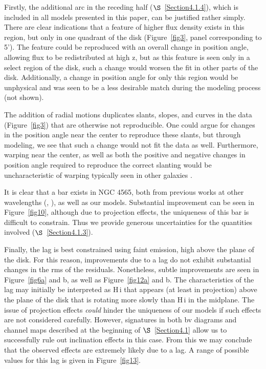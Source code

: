 \documentclass{emulateapj}
\begin{document}
\par 
    Firstly, the additional arc in the receding half ($\S$~\ref{Section4.1.4}), which is included in all models presented in this paper, can be justified rather simply.  There are clear indications that a feature of higher flux density exists in this region, but only in one quadrant of the disk (Figure~\ref{fig3}, panel corresponding to 5').  The feature could be reproduced with an overall change in position angle, allowing flux to be redistributed at high z, but as this feature is seen only in a select region of the disk, such a change would worsen the fit in other parts of the disk.  Additionally, a change in position angle for only this region would be unphysical and was seen to be a less desirable match during the modeling process (not shown).  

\par
    The addition of radial motions duplicates slants, slopes, and curves in the data (Figure~\ref{fig3}) that are otherwise not reproducible.  One could argue for changes in the position angle near the center to reproduce these slants, but through modeling, we see that such a change would not fit the data as well.  Furthermore, warping near the center, as well as both the positive and negative changes in position angle required to reproduce the correct slanting would be uncharacteristic of warping typically seen in other galaxies \citep{1990ApJ...352...15B}.

\par
    It is clear that a bar exists in NGC 4565, both from previous works at other wavelengths (\citealt{2010ApJ...715L.176K}, \citealt{1996A&A...310..725N}), as well as our models.  Substantial improvement can be seen in Figure~\ref{fig10}, although due to projection effects, the uniqueness of this bar is difficult to constrain. Thus we provide generous uncertainties for the quantities involved ($\S$~\ref{Section4.1.3}).

\par
    Finally, the lag is best constrained using faint emission, high above the plane of the disk.  For this reason, improvements due to a lag do not exhibit substantial changes in the rms of the residuals.  Nonetheless, subtle improvements are seen in Figure~\ref{fig6a} and b, as well as Figure~\ref{fig12a} and b.  The characteristics of the lag may initially be interpreted as {\sc H\,i} that appears (at least in projection) above the plane of the disk that is rotating more slowly than {\sc H\,i} in the midplane.  The issue of projection effects \textit{could} hinder the uniqueness of our models if such effects are not considered carefully.  However, signatures in both bv diagrams and channel maps described at the beginning of $\S$~\ref{Section4.1} allow us to successfully rule out inclination effects in this case.  From this we may conclude that the observed effects are extremely likely due to a lag.  A range of possible values for this lag is given in Figure~\ref{fig13}.
\end{document}
